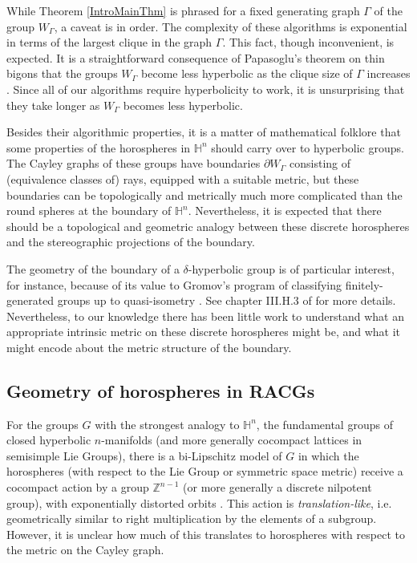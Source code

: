 \documentclass[10pt,a4paper]{amsart}
\newcommand{\Z}{\mathbb{Z}}
\newcommand{\h}{\mathbb{H}}
\theoremstyle{definition}
\theoremstyle{remark}
\begin{document}
	While Theorem \ref{IntroMainThm} is phrased for a fixed generating graph $\Gamma$ of the group $W_\Gamma$, a caveat is in order. The complexity of these algorithms is exponential in terms of the largest clique in the graph $\Gamma$. This fact, though inconvenient, is expected. It is a straightforward consequence of Papasoglu's theorem on thin bigons that the groups $W_\Gamma$ become less hyperbolic as the clique size of $\Gamma$ increases \cite{Papasoglu1995}. Since all of our algorithms require hyperbolicity to work, it is unsurprising that they take longer as $W_\Gamma$ becomes less hyperbolic.
	
	Besides their algorithmic properties, it is a matter of mathematical folklore that some properties of the horospheres in $\h^n$ should carry over to hyperbolic groups. The Cayley graphs of these groups have boundaries $\partial W_\Gamma$ consisting of (equivalence classes of) rays, equipped with a suitable metric, but these boundaries can be topologically and metrically much more complicated than the round spheres at the boundary of $\h^n$. Nevertheless, it is expected that there should be a topological and geometric analogy between these discrete horospheres and the stereographic projections of the boundary.
	
	The geometry of the boundary of a $\delta$-hyperbolic group is of particular interest, for instance, because of its value to Gromov's program of classifying finitely-generated groups up to quasi-isometry \cite{GromovAsymptotic}. See chapter III.H.3 of \cite{BridsonHaefliger} for more details. Nevertheless, to our knowledge there has been little work to understand what an appropriate intrinsic metric on these discrete horospheres might be, and what it might encode about the metric structure of the boundary.
    
    \subsection*{Geometry of horospheres in RACGs}
    
    For the groups $G$ with the strongest analogy to $\h^n$, the fundamental groups of closed hyperbolic $n$-manifolds (and more generally cocompact lattices in semisimple Lie Groups), there is a bi-Lipschitz model of $G$ in which the horospheres (with respect to the Lie Group or symmetric space metric) receive a cocompact action by a group $\Z^{n-1}$ (or more generally a discrete nilpotent group), with exponentially distorted orbits \cite{PengitoreMcReynolds}. This action is \textit{translation-like}, i.e. geometrically similar to right multiplication by the elements of a subgroup. However, it is unclear how much of this translates to horospheres with respect to the metric on the Cayley graph.
	
\end{document}
